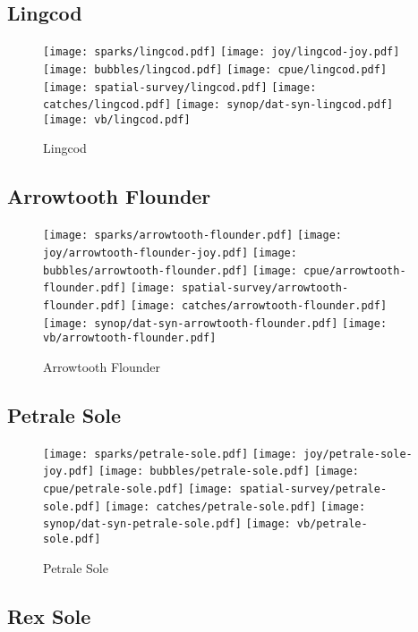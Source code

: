 \subsection*{Lingcod}

\begin{figure}[htbp]
\centering
\texttt{[image: sparks/lingcod.pdf]}
\texttt{[image: joy/lingcod-joy.pdf]}
\texttt{[image: bubbles/lingcod.pdf]}
\texttt{[image: cpue/lingcod.pdf]}
\texttt{[image: spatial-survey/lingcod.pdf]}
\texttt{[image: catches/lingcod.pdf]}
\texttt{[image: synop/dat-syn-lingcod.pdf]}
\texttt{[image: vb/lingcod.pdf]}
\caption{Lingcod}
\end{figure}
\clearpage
\subsection*{Arrowtooth Flounder}

\begin{figure}[htbp]
\centering
\texttt{[image: sparks/arrowtooth-flounder.pdf]}
\texttt{[image: joy/arrowtooth-flounder-joy.pdf]}
\texttt{[image: bubbles/arrowtooth-flounder.pdf]}
\texttt{[image: cpue/arrowtooth-flounder.pdf]}
\texttt{[image: spatial-survey/arrowtooth-flounder.pdf]}
\texttt{[image: catches/arrowtooth-flounder.pdf]}
\texttt{[image: synop/dat-syn-arrowtooth-flounder.pdf]}
\texttt{[image: vb/arrowtooth-flounder.pdf]}
\caption{Arrowtooth Flounder}
\end{figure}
\clearpage
\subsection*{Petrale Sole}

\begin{figure}[htbp]
\centering
\texttt{[image: sparks/petrale-sole.pdf]}
\texttt{[image: joy/petrale-sole-joy.pdf]}
\texttt{[image: bubbles/petrale-sole.pdf]}
\texttt{[image: cpue/petrale-sole.pdf]}
\texttt{[image: spatial-survey/petrale-sole.pdf]}
\texttt{[image: catches/petrale-sole.pdf]}
\texttt{[image: synop/dat-syn-petrale-sole.pdf]}
\texttt{[image: vb/petrale-sole.pdf]}
\caption{Petrale Sole}
\end{figure}
\clearpage
\subsection*{Rex Sole}


